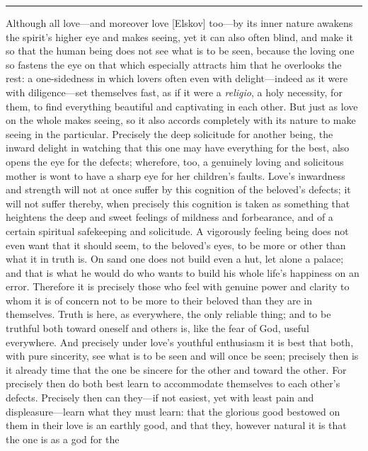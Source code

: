 \documentclass[12pt,a4paper]{book}
\begin{document}
\begin{center}\rule{0.28\linewidth}{0.4pt}\end{center}

Although all love---and moreover love [Elskov] too---by its inner nature
awakens the spirit's higher eye and makes seeing, yet it can also often
blind, and make it so that the human being does not see what is to be seen,
because the loving one so fastens the eye on that which especially attracts
him that he overlooks the rest: a one-sidedness in which lovers often even
with delight---indeed as it were with diligence---set themselves fast, as if
it were a \textit{religio}, a holy necessity, for them, to find everything
beautiful and captivating in each other. But just as love on the whole
makes seeing, so it also accords completely with its nature to make seeing
in the particular. Precisely the deep solicitude for another being, the
inward delight in watching that this one may have everything for the best,
also opens the eye for the defects; wherefore, too, a genuinely loving and
solicitous mother is wont to have a sharp eye for her children's faults.
Love's inwardness and strength will not at once suffer by this cognition of
the beloved's defects; it will not suffer thereby, when precisely this
cognition is taken as something that heightens the deep and sweet feelings
of mildness and forbearance, and of a certain spiritual safekeeping and
solicitude. A vigorously feeling being does not even want that it should
seem, to the beloved's eyes, to be more or other than what it in truth is.
On sand one does not build even a hut, let alone a palace; and that is what
he would do who wants to build his whole life's happiness on an error.
Therefore it is precisely those who feel with genuine power and clarity to
whom it is of concern not to be more to their beloved than they are in
themselves. Truth is here, as everywhere, the only reliable thing; and to
be truthful both toward oneself and others is, like the fear of God, useful
everywhere. And precisely under love's youthful enthusiasm it is best that
both, with pure sincerity, see what is to be seen and will once be seen;
precisely then is it already time that the one be sincere for the other and
toward the other. For precisely then do both best learn to accommodate
themselves to each other's defects. Precisely then can they---if not
easiest, yet with least pain and displeasure---learn what they must learn:
that the glorious good bestowed on them in their love is an earthly good,
and that they, however natural it is that the one is as a god for the
\end{document}
